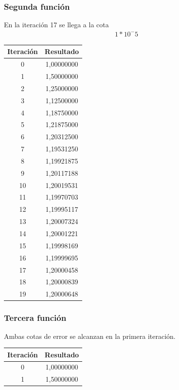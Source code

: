 \documentclass[titlepage,a4paper]{article}
\begin{document}
\subsubsection{Segunda función}\label{sec:bis2}
En la iteración 17 se llega a la cota \begin{align}1*10^-5
\end{align}
\begin{tabular}{| c | c |}
\hline
 Iteración & Resultado \\ \hline
0     & 1,00000000 \\
    1     & 1,50000000 \\
    2     & 1,25000000 \\
    3     & 1,12500000 \\
    4     & 1,18750000 \\
    5     & 1,21875000 \\
    6     & 1,20312500 \\
    7     & 1,19531250 \\
    8     & 1,19921875 \\
    9     & 1,20117188 \\
    10    & 1,20019531 \\
    11    & 1,19970703 \\
    12    & 1,19995117 \\
    13    & 1,20007324 \\
    14    & 1,20001221 \\
    15    & 1,19998169 \\
    16    & 1,19999695 \\
    17    & 1,20000458 \\
    18    & 1,20000839 \\
    19    & 1,20000648 \\
\hline
\end{tabular}
\subsubsection{Tercera función}\label{sec:bis3}
Ambas cotas de error se alcanzan en la primera iteración.
\begin{tabular}{| c | c |}
\hline
 Iteración & Resultado \\ \hline
0     & 1,00000000 \\
    1     & 1,50000000 \\
\hline
\end{tabular}
\end{document}
